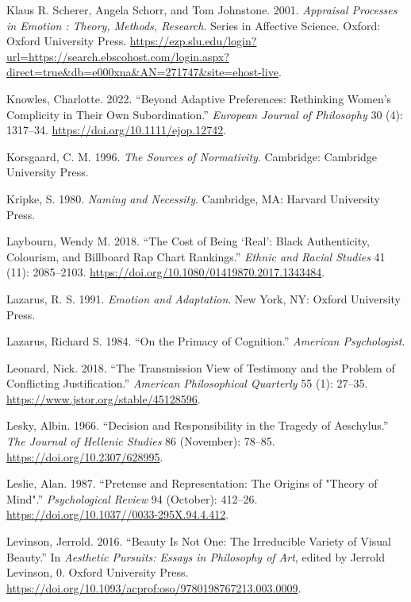 \documentclass[12pt]{book}
\newenvironment{CSLReferences}%
  {\setlength{\parindent}{0pt}%
   \setlength{\leftskip}{0pt}%
   \setlength{\parskip}{0pt}}%
  {\par}
\theoremstyle{definition}
\theoremstyle{remark}
\begin{document}
\begin{CSLReferences}{1}{0}
Klaus R. Scherer, Angela Schorr, and Tom Johnstone. 2001. \emph{Appraisal {Processes} in {Emotion} : {Theory}, {Methods}, {Research}}. Series in {Affective Science}. Oxford: Oxford University Press. \url{https://ezp.slu.edu/login?url=https://search.ebscohost.com/login.aspx?direct=true&db=e000xna&AN=271747&site=ehost-live}.

Knowles, Charlotte. 2022. {``Beyond Adaptive Preferences: {Rethinking} Women's Complicity in Their Own Subordination.''} \emph{European Journal of Philosophy} 30 (4): 1317--34. \url{https://doi.org/10.1111/ejop.12742}.

Korsgaard, C. M. 1996. \emph{The Sources of Normativity}. Cambridge: Cambridge University Press.

Kripke, S. 1980. \emph{Naming and Necessity}. Cambridge, MA: Harvard University Press.

Laybourn, Wendy M. 2018. {``The Cost of Being {`Real'}: Black Authenticity, Colourism, and {Billboard Rap Chart} Rankings.''} \emph{Ethnic and Racial Studies} 41 (11): 2085--2103. \url{https://doi.org/10.1080/01419870.2017.1343484}.

Lazarus, R. S. 1991. \emph{Emotion and Adaptation}. New York, NY: Oxford University Press.

Lazarus, Richard S. 1984. {``On the {Primacy} of {Cognition}.''} \emph{American Psychologist}.

Leonard, Nick. 2018. {``The {Transmission View} of {Testimony} and the {Problem} of {Conflicting Justification}.''} \emph{American Philosophical Quarterly} 55 (1): 27--35. \url{https://www.jstor.org/stable/45128596}.

Lesky, Albin. 1966. {``Decision and {Responsibility} in the {Tragedy} of {Aeschylus}.''} \emph{The Journal of Hellenic Studies} 86 (November): 78--85. \url{https://doi.org/10.2307/628995}.

Leslie, Alan. 1987. {``Pretense and {Representation}: {The Origins} of "{Theory} of {Mind}".''} \emph{Psychological Review} 94 (October): 412--26. \url{https://doi.org/10.1037//0033-295X.94.4.412}.

Levinson, Jerrold. 2016. {``Beauty Is {Not One}: {The Irreducible Variety} of {Visual Beauty}.''} In \emph{Aesthetic {Pursuits}: {Essays} in {Philosophy} of {Art}}, edited by Jerrold Levinson, 0. Oxford University Press. \url{https://doi.org/10.1093/acprof:oso/9780198767213.003.0009}.


\end{CSLReferences}
\end{document}
